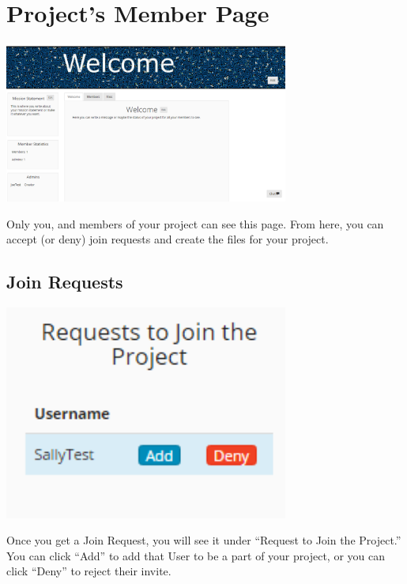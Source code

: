 \documentclass[11pt]{report}
\begin{document}
\chapter{Project's Member Page}
	\begin{center}
           \includegraphics[width=0.7\textwidth]{memberpage.png}
    \end{center}
Only you, and members of your project can see this page. From here, you can accept (or deny) join requests and create the files for your project.

\section{Join Requests}
	\begin{center}
           \includegraphics[width=0.7\textwidth]{joinrequest.png}
    \end{center}
Once you get a Join Request, you will see it under “Request to Join the Project.” You can click “Add” to add that User to be a part of your project, or you can click “Deny” to reject their invite.
\end{document}
